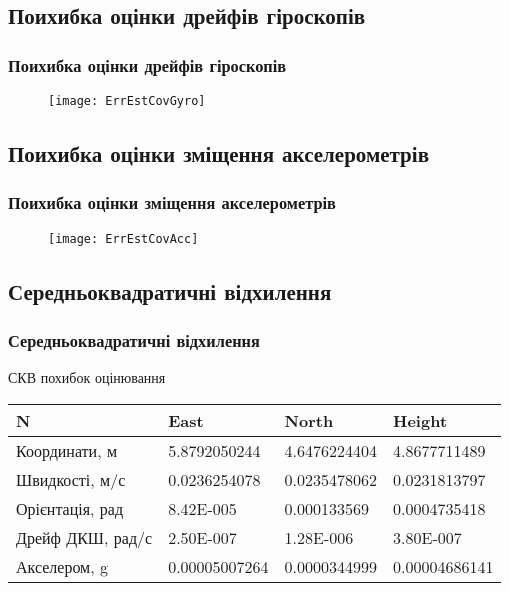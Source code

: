\documentclass[ucs]{beamer}
\begin{document}
\subsection{Поихибка оцінки дрейфів гіроскопів} 
\begin{frame}%
\frametitle{Поихибка оцінки дрейфів гіроскопів}
\noindent
\begin{figure}
\texttt{[image: ErrEstCovGyro]}
\end{figure}
\end{frame}
\subsection{Поихибка оцінки зміщення акселерометрів} 
\begin{frame}%
\frametitle{Поихибка оцінки зміщення акселерометрів}
\begin{figure}
\centering
\texttt{[image: ErrEstCovAcc]}
\end{figure}
\end{frame}
\subsection{Середньоквадратичні відхилення}
\begin{frame}
\frametitle{Середньоквадратичні відхилення}

\begin{block}{СКВ похибок оцінювання}
\begin{table}%
\centering
\small
\begin{tabular}{|p{30mm}|p{20mm}|p{20mm}|p{20mm}|} \hline
N&East&North&Height \\ \hline
Координати, м & 5.8792050244& 4.6476224404& 4.8677711489 \\ \hline 
Швидкості, м/с& 0.0236254078& 0.0235478062& 0.0231813797 \\ \hline 
Орієнтація, рад& 8.42E-005& 0.000133569& 0.0004735418 \\ \hline 
Дрейф ДКШ, рад/с& 2.50E-007& 1.28E-006 & 3.80E-007 \\ \hline 
Акселером, g & 0.00005007264& 0.0000344999 & 0.00004686141 \\ \hline 
\end{tabular}
\label{tab:results}
\end{table}
\end{block}
\end{frame}
\end{document}
